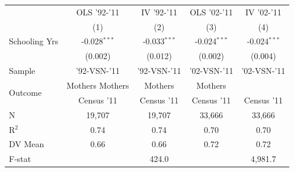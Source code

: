 
\begin{tabular}[t]{lcccc}
\toprule
  & OLS '92-'11 & IV '92-'11 & OLS '02-'11 & IV '02-'11\\
  & (1) & (2) & (3) & (4)\\
\midrule
Schooling Yrs & -0.028$^{***}$ & -0.033$^{***}$ & -0.024$^{***}$ & -0.024$^{***}$\\
 & (0.002) & (0.012) & (0.002) & (0.004)\\
\midrule
Sample & '92-VSN-'11 & '92-VSN-'11 & '02-VSN-'11 & '02-VSN-'11\\
\multirow{2}{*}{\centering Outcome} & Mothers Mothers & Mothers & Mothers\\
& Census '11 & Census '11 & Census '11 & Census '11\\
\midrule
N & 19,707 & 19,707 & 33,666 & 33,666\\
R$^2$ & 0.74 & 0.74 & 0.70 & 0.70\\
DV Mean & 0.66 & 0.66 & 0.72 & 0.72\\
F-stat &  & 424.0 &  & 4,981.7\\
\bottomrule
\end{tabular}

